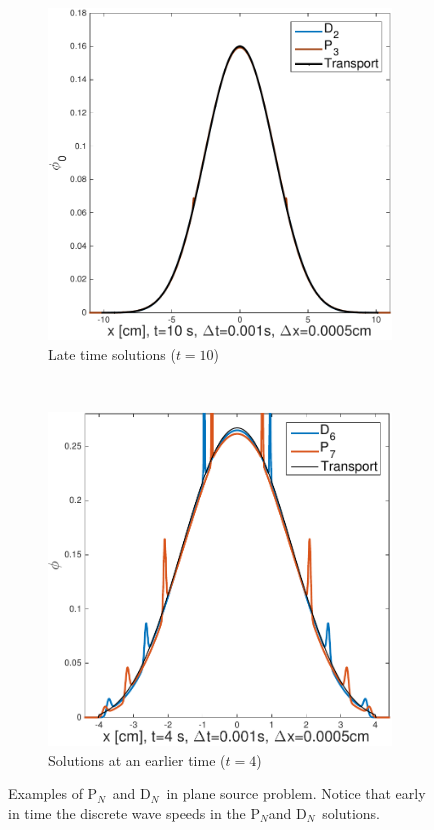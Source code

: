 \documentclass[review]{elsarticle}
\newcommand{\pn}{P$_N$}
\newcommand{\dn}{D$_N$}
\begin{document}
\begin{figure}[ht!]
	\begin{subfigure}{.5\textwidth}
		\centering
		\hspace*{-1cm}\includegraphics[width=1.\linewidth]{gd0.pdf}
		\caption{Late time solutions ($t=10$)}
		\label{f:gd0}
	\end{subfigure}
	~
	\begin{subfigure}{.5\textwidth}
		\centering
		\includegraphics[width=1.\linewidth]{bd0.pdf}
		\caption{Solutions at an earlier time ($t=4$)}
		\label{f:bd0}
	\end{subfigure}
	\caption{Examples of \pn\ and \dn\ in plane source problem. Notice that early in time the discrete wave speeds in the \pn and \dn~solutions.}
	

\end{figure}
\end{document}
